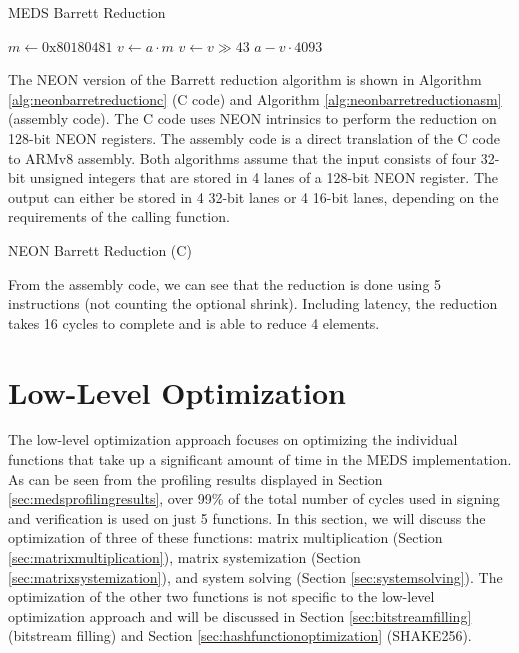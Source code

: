 \documentclass[11pt,a4paper]{report}
\theoremstyle{definition}
\begin{document}
\begin{algorithm}
  \caption{MEDS Barrett Reduction}
  \label{alg:barrettreduction}
  \begin{algorithmic}
      \State $m \gets 0\text{x}80180481$
      \State $v \gets a \cdot m$
      \State $v \gets v \gg 43$
      \State \Return $a - v \cdot 4093$
    \EndFunction
  \end{algorithmic}
\end{algorithm}

The NEON version of the Barrett reduction algorithm is shown in Algorithm \ref{alg:neonbarretreductionc} (C code) and Algorithm \ref{alg:neonbarretreductionasm} (assembly code). The C code uses NEON intrinsics to perform the reduction on 128-bit NEON registers. The assembly code is a direct translation of the C code to ARMv8 assembly. Both algorithms assume that the input consists of four 32-bit unsigned integers that are stored in 4 lanes of a 128-bit NEON register. The output can either be stored in 4 32-bit lanes or 4 16-bit lanes, depending on the requirements of the calling function.

\begin{algorithm}
  \caption{NEON Barrett Reduction (C)}
  \label{alg:neonbarretreductionc}
  
\end{algorithm}

\begin{algorithm}
  \caption{NEON Barrett Reduction (Assembly)}
  \label{alg:neonbarretreductionasm}
  Assembler}, style=ASMStyle]{code/barrett_reduce_asm.s}
\end{algorithm}

From the assembly code, we can see that the reduction is done using 5 instructions (not counting the optional shrink). Including latency, the reduction takes 16 cycles to complete and is able to reduce 4 elements.

\section{Low-Level Optimization}
\label{sec:lowleveloptimization}
The low-level optimization approach focuses on optimizing the individual functions that take up a significant amount of time in the MEDS implementation. As can be seen from the profiling results displayed in Section \ref{sec:medsprofilingresults}, over 99\% of the total number of cycles used in signing and verification is used on just 5 functions. In this section, we will discuss the optimization of three of these functions: matrix multiplication (Section \ref{sec:matrixmultiplication}), matrix systemization (Section \ref{sec:matrixsystemization}), and system solving (Section \ref{sec:systemsolving}). The optimization of the other two functions is not specific to the low-level optimization approach and will be discussed in Section \ref{sec:bitstreamfilling} (bitstream filling) and Section \ref{sec:hashfunctionoptimization} (SHAKE256).
\end{document}
